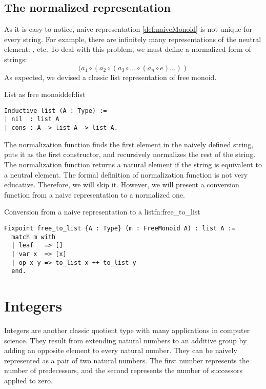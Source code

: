 \subsection{The normalized representation}
As it is easy to notice, naive representation \ref{def:naiveMonoid} is not unique for every string. For example, there are infinitely many representations of the neutral element: ,  etc. To deal with this problem, we must define a normalized form of strings:
$$
    (a_1 \circ (a_2 \circ (a_3 \circ \dots  \circ (a_n \circ e) \dots ))
$$
As expected, we devised a classic list representation of free monoid. 
\begin{defi}{List as free monoid}{def:list}
\begin{verbatim}
Inductive list (A : Type) :=
| nil  : list A
| cons : A -> list A -> list A.
\end{verbatim}
\end{defi}
The normalization function finds the first element in the naively defined string, puts it as the first constructor, and recursively normalizes the rest of the string. The normalization function returns a natural element if the string is equivalent to a neutral element.
The formal definition of normalization function is not very educative. Therefore, we will skip it. However, we will present a conversion function from a naive representation to a normalized one.
\begin{func}{Conversion from a naive representation to a list}{fn:free_to_list}
\begin{verbatim}
Fixpoint free_to_list {A : Type} (m : FreeMonoid A) : list A :=
  match m with
  | leaf   => []
  | var x  => [x]
  | op x y => to_list x ++ to_list y
  end.
\end{verbatim}
\end{func}
\section{Integers}
Integers are another classic quotient type with many applications in computer science. They result from extending natural numbers to an additive group by adding an opposite element to every natural number. They can be naively represented as a pair of two natural numbers. The first number represents the number of predecessors, and the second represents the number of successors applied to zero.

